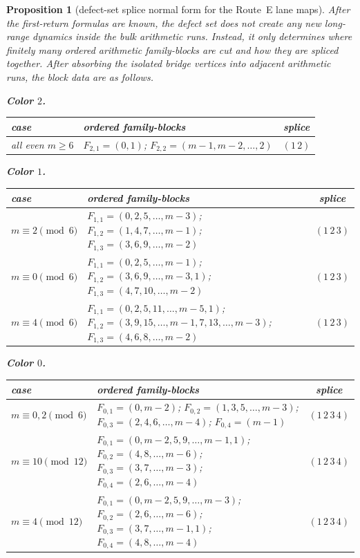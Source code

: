 \documentclass[11pt]{article}
\newtheorem{proposition}{Proposition}
\begin{document}
\begin{proposition}[defect-set splice normal form for the Route~E lane maps]\label{prop:routeE-splice}
After the first-return formulas are known, the defect set does not create any new long-range dynamics inside the bulk arithmetic runs.
Instead, it only determines where finitely many ordered arithmetic family-blocks are cut and how they are spliced together.
After absorbing the isolated bridge vertices into adjacent arithmetic runs, the block data are as follows.

\medskip
\noindent\textbf{Color $2$.}
\begin{center}
{\footnotesize
\renewcommand{\arraystretch}{1.15}
\begin{tabularx}{\textwidth}{@{}l>{\raggedright\arraybackslash}Xc@{}}
\toprule
case & ordered family-blocks & splice \\
\midrule
all even $m\ge 6$ & $F_{2,1}=(0,1)$; $F_{2,2}=(m-1,m-2,\dots,2)$ & $(1\,2)$ \\
\bottomrule
\end{tabularx}
}
\end{center}

\medskip
\noindent\textbf{Color $1$.}
\begin{center}
{\footnotesize
\renewcommand{\arraystretch}{1.15}
\begin{tabularx}{\textwidth}{@{}l>{\raggedright\arraybackslash}Xc@{}}
\toprule
case & ordered family-blocks & splice \\
\midrule
$m\equiv 2\pmod 6$ & $F_{1,1}=(0,2,5,\dots,m-3)$; $F_{1,2}=(1,4,7,\dots,m-1)$; $F_{1,3}=(3,6,9,\dots,m-2)$ & $(1\,2\,3)$ \\
$m\equiv 0\pmod 6$ & $F_{1,1}=(0,2,5,\dots,m-1)$; $F_{1,2}=(3,6,9,\dots,m-3,1)$; $F_{1,3}=(4,7,10,\dots,m-2)$ & $(1\,2\,3)$ \\
$m\equiv 4\pmod 6$ & $F_{1,1}=(0,2,5,11,\dots,m-5,1)$; $F_{1,2}=(3,9,15,\dots,m-1,7,13,\dots,m-3)$; $F_{1,3}=(4,6,8,\dots,m-2)$ & $(1\,2\,3)$ \\
\bottomrule
\end{tabularx}
}
\end{center}

\medskip
\noindent\textbf{Color $0$.}
\begin{center}
{\footnotesize
\renewcommand{\arraystretch}{1.15}
\begin{tabularx}{\textwidth}{@{}l>{\raggedright\arraybackslash}Xc@{}}
\toprule
case & ordered family-blocks & splice \\
\midrule
$m\equiv 0,2\pmod 6$ & $F_{0,1}=(0,m-2)$; $F_{0,2}=(1,3,5,\dots,m-3)$; $F_{0,3}=(2,4,6,\dots,m-4)$; $F_{0,4}=(m-1)$ & $(1\,2\,3\,4)$ \\
$m\equiv 10\pmod{12}$ & $F_{0,1}=(0,m-2,5,9,\dots,m-1,1)$; $F_{0,2}=(4,8,\dots,m-6)$; $F_{0,3}=(3,7,\dots,m-3)$; $F_{0,4}=(2,6,\dots,m-4)$ & $(1\,2\,3\,4)$ \\
$m\equiv 4\pmod{12}$ & $F_{0,1}=(0,m-2,5,9,\dots,m-3)$; $F_{0,2}=(2,6,\dots,m-6)$; $F_{0,3}=(3,7,\dots,m-1,1)$; $F_{0,4}=(4,8,\dots,m-4)$ & $(1\,2\,3\,4)$ \\
\bottomrule
\end{tabularx}
}
\end{center}


\end{proposition}
\end{document}
